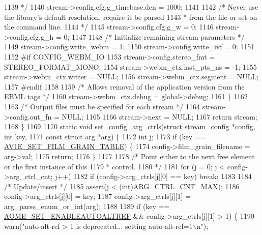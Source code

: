 \begin{DoxyCodeInclude}
{{{{{{{{{{{{{{{{1139 \textcolor{comment}{     */}
1140     stream->config.cfg.g\_timebase.den = 1000;
1141 
1142     \textcolor{comment}{/* Never use the library's default resolution, require it be parsed}
1143 \textcolor{comment}{     * from the file or set on the command line.}
1144 \textcolor{comment}{     */}
1145     stream->config.cfg.g\_w = 0;
1146     stream->config.cfg.g\_h = 0;
1147 
1148     \textcolor{comment}{/* Initialize remaining stream parameters */}
1149     stream->config.write\_webm = 1;
1150     stream->config.write\_ivf = 0;
1151 
1152 \textcolor{preprocessor}{#if CONFIG\_WEBM\_IO}
1153     stream->config.stereo\_fmt = STEREO\_FORMAT\_MONO;
1154     stream->webm\_ctx.last\_pts\_ns = -1;
1155     stream->webm\_ctx.writer = NULL;
1156     stream->webm\_ctx.segment = NULL;
1157 \textcolor{preprocessor}{#endif}
1158 
1159     \textcolor{comment}{/* Allows removal of the application version from the EBML tags */}
1160     stream->webm\_ctx.debug = global->debug;
1161   \}
1162 
1163   \textcolor{comment}{/* Output files must be specified for each stream */}
1164   stream->config.out\_fn = NULL;
1165 
1166   stream->next = NULL;
1167   \textcolor{keywordflow}{return} stream;
1168 \}
1169 
1170 \textcolor{keyword}{static} \textcolor{keywordtype}{void} set\_config\_arg\_ctrls(\textcolor{keyword}{struct} stream\_config *config, \textcolor{keywordtype}{int} key,
1171     \textcolor{keyword}{const} \textcolor{keyword}{struct} arg *arg) \{
1172   \textcolor{keywordtype}{int} j;
1173   \textcolor{keywordflow}{if} (key == \hyperlink{group__aom__encoder_ggae78dde67a6d78f332e9bdba0dde42db5ad5846c6f49d37e65a03c39e68d487097}{AV1E\_SET\_FILM\_GRAIN\_TABLE}) \{
1174     config->film\_grain\_filename = arg->val;
1175     \textcolor{keywordflow}{return};
1176   \}
1177 
1178   \textcolor{comment}{/* Point either to the next free element or the first instance of this}
1179 \textcolor{comment}{   * control.}
1180 \textcolor{comment}{   */}
1181   \textcolor{keywordflow}{for} (j = 0; j < config->arg\_ctrl\_cnt; j++)
1182     \textcolor{keywordflow}{if} (config->arg\_ctrls[j][0] == key) \textcolor{keywordflow}{break};
1183 
1184   \textcolor{comment}{/* Update/insert */}
1185   assert(j < (\textcolor{keywordtype}{int})ARG\_CTRL\_CNT\_MAX);
1186   config->arg\_ctrls[j][0] = key;
1187   config->arg\_ctrls[j][1] = arg\_parse\_enum\_or\_int(arg);
1188 
1189   \textcolor{keywordflow}{if} (key == \hyperlink{group__aom__encoder_ggae78dde67a6d78f332e9bdba0dde42db5ac8a24393f214823f5a6bd345afb840b6}{AOME\_SET\_ENABLEAUTOALTREF} && config->arg\_ctrls[j][1] > 1) \{
1190     warn(\textcolor{stringliteral}{"auto-alt-ref > 1 is deprecated... setting auto-alt-ref=1\(\backslash\)n"});
}}}}}}}}}}}}}}}}
\end{DoxyCodeInclude}
